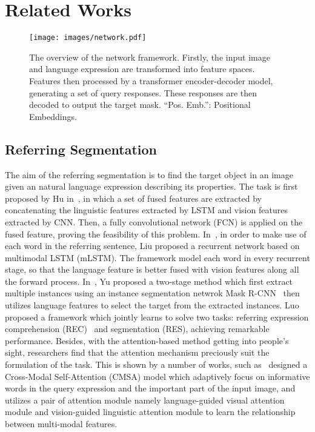 \documentclass[10pt,twocolumn,letterpaper]{article}
\begin{document}
\section{Related Works}


\begin{figure*}[t]
   \begin{center}
      \texttt{[image: images/network.pdf]}
   \end{center}
\caption{The overview of the network framework. Firstly, the input image and language expression are transformed into feature spaces. Features then processed by a transformer encoder-decoder model, generating a set of query responses. These responses are then decoded to output the target mask. ``Pos. Emb.'': Positional Embeddings.}
   \label{fig:network}
\end{figure*}
\subsection{Referring Segmentation}

The aim of the referring segmentation is to find the target object in an image given an natural language expression describing its properties. The task is first proposed by Hu \etal in~\cite{hu2016segmentation}, in which a set of fused features are extracted by concatenating the linguistic features extracted by LSTM and vision features extracted by CNN. Then, a fully convolutional network (FCN) is applied on the fused feature, proving the feasibility of this problem. In~\cite{liu2017recurrent}, in order to make use of each word in the referring sentence, Liu \etal proposed a recurrent network based on multimodal LSTM (mLSTM). The framework model each word in every recurrent stage, so that the language feature is better fused with vision features along all the forward process. In~\cite{yu2018mattnet}, Yu \etal proposed a two-stage method which first extract multiple instances using an instance segmentation netwrok Mask R-CNN~\cite{he2017mask} then utilizes language features to select the target from the extracted instances. Luo \etal~\cite{luo2020multi} proposed a framework which jointly learns to solve two tasks: referring expression comprehension (REC)~\cite{luo2017comprehension, hu2017modeling} and segmentation (RES), achieving remarkable performance. Besides, with the attention-based method getting into people's sight, researchers find that the attention mechanism preciously suit the formulation of the task. This is shown by a number of works, such as~\cite{ye2019cross} designed a Cross-Modal Self-Attention (CMSA) model which adaptively focus on informative words in the query expression and the important part of the input image, and~\cite{hu2020bi} utilizes a pair of attention module namely language-guided visual attention module and vision-guided linguistic attention module to learn the relationship between multi-modal features.
\end{document}
